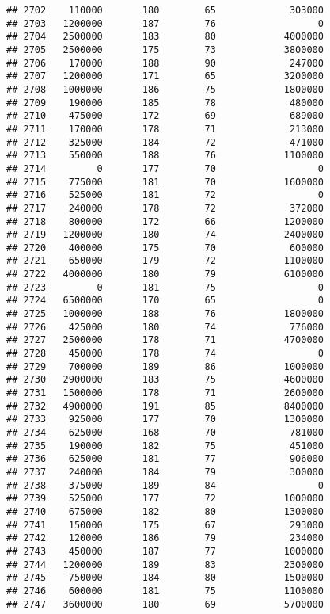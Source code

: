 \documentclass[
]{article}
\begin{document}
\begin{verbatim}
## 2702    110000       180        65             303000
## 2703   1200000       187        76                  0
## 2704   2500000       183        80            4000000
## 2705   2500000       175        73            3800000
## 2706    170000       188        90             247000
## 2707   1200000       171        65            3200000
## 2708   1000000       186        75            1800000
## 2709    190000       185        78             480000
## 2710    475000       172        69             689000
## 2711    170000       178        71             213000
## 2712    325000       184        72             471000
## 2713    550000       188        76            1100000
## 2714         0       177        70                  0
## 2715    775000       181        70            1600000
## 2716    525000       181        72                  0
## 2717    240000       178        72             372000
## 2718    800000       172        66            1200000
## 2719   1200000       180        74            2400000
## 2720    400000       175        70             600000
## 2721    650000       179        72            1100000
## 2722   4000000       180        79            6100000
## 2723         0       181        75                  0
## 2724   6500000       170        65                  0
## 2725   1000000       188        76            1800000
## 2726    425000       180        74             776000
## 2727   2500000       178        71            4700000
## 2728    450000       178        74                  0
## 2729    700000       189        86            1000000
## 2730   2900000       183        75            4600000
## 2731   1500000       178        71            2600000
## 2732   4900000       191        85            8400000
## 2733    925000       177        70            1300000
## 2734    625000       168        70             781000
## 2735    190000       182        75             451000
## 2736    625000       181        77             906000
## 2737    240000       184        79             300000
## 2738    375000       189        84                  0
## 2739    525000       177        72            1000000
## 2740    675000       182        80            1300000
## 2741    150000       175        67             293000
## 2742    120000       186        79             234000
## 2743    450000       187        77            1000000
## 2744   1200000       189        83            2300000
## 2745    750000       184        80            1500000
## 2746    600000       181        75            1100000
## 2747   3600000       180        69            5700000

\end{verbatim}
\end{document}
